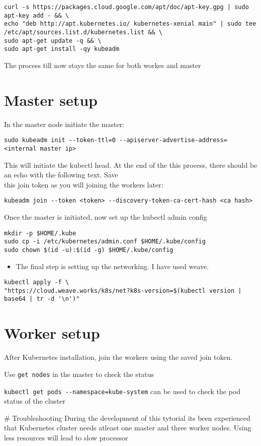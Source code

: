 \begin{lstlisting}
curl -s https://packages.cloud.google.com/apt/doc/apt-key.gpg | sudo apt-key add - && \
echo "deb http://apt.kubernetes.io/ kubernetes-xenial main" | sudo tee /etc/apt/sources.list.d/kubernetes.list && \
sudo apt-get update -q && \
sudo apt-get install -qy kubeadm
\end{lstlisting}

The process till now stays the same for both workes and master

\section{Master setup}

In the master node initiate the master:

\begin{lstlisting}
sudo kubeadm init --token-ttl=0 --apiserver-advertise-address=<internal master ip>
\end{lstlisting}

This will initiate the kubectl head. At the end of the this process,
there should be an echo with the following text. Save\\
this join token as you will joining the workers later:

\begin{lstlisting}
kubeadm join --token <token> --discovery-token-ca-cert-hash <ca hash>
\end{lstlisting}

Once the master is initiated, now set up the kubectl admin config

\begin{lstlisting}
mkdir -p $HOME/.kube
sudo cp -i /etc/kubernetes/admin.conf $HOME/.kube/config
sudo chown $(id -u):$(id -g) $HOME/.kube/config
\end{lstlisting}

\begin{itemize}
\item
  The final step is setting up the networking. I have used weave.
\end{itemize}

\begin{lstlisting}
kubectl apply -f \
"https://cloud.weave.works/k8s/net?k8s-version=$(kubectl version | base64 | tr -d '\n')"
\end{lstlisting}

\section{Worker setup}

After Kubernetes installation, join the workers using the saved join
token.

Use \texttt{get\ nodes} in the master to check the status

\texttt{kubectl\ get\ pods\ -\/-namespace=kube-system} can be used to
check the pod status of the cluster

\# Troubleshooting During the development of this tytorial its been
experienced that Kubernetes cluster needs atleast one master and three
worker nodes. Using less resources will lead to slow processor

